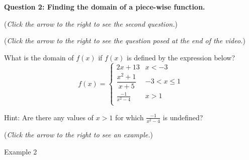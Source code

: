 \documentclass{ximera}
\begin{document}
\textbf{Question 2: Finding the domain of a piece-wise function.}
\begin{question}
\begin{flushright}
{\color{blue}(\emph{Click the arrow to the right to see the second question.})}
\end{flushright}
\begin{center}
\begin{expandable}
\begin{flushright}
{\color{blue}(\emph{Click the arrow to the right to see the  question
posed at the end of the video.})}
\end{flushright}
\begin{expandable}
What is the domain of $f(x)$ if $f(x)$ is defined by the expression below?\\

\[ f(x) = \begin{cases} 
      2x+13 & x<-3 \\
      \dfrac{x^2+1}{x+5} & -3< x\leq 1 \\
      \frac{-1}{x^2-4} & x> 1\\	
   \end{cases} \]

\begin{multipleChoice}
\choice{$(-\infty, -3]$}
\choice{$(-3, 1]$}
\choice{$[-3,-1]$}
\choice{$[1, \infty)$}
\choice{$(-\infty, -3) \cup (-3, 1]$}
\choice{$(-3, 1] \cup (1, \infty)$}
\choice{$(-\infty, -3) \cup (-3, 1] \cup [1, \infty)$}
\choice{$(-\infty, -3) \cup (-3, -2) \cup (-2, 1] \cup (1, 2) \cup (2, \infty)$}
\choice[correct]{$(-\infty, -3) \cup (-3, 1] \cup (1, 2) \cup (2, \infty)$}
\end{multipleChoice}

Hint: Are there any values of $x>1$ for which $\frac{-1}{x^2-4}$ is undefined?

\begin{flushright}
{\color{blue}(\emph{Click the arrow to the right to see an example.})}
\end{flushright}
\begin{expandable}
\begin{center}
Example 2
\end{center}
\end{expandable}
\end{expandable}
\end{expandable}
\end{center}
\end{question}
\end{document}
